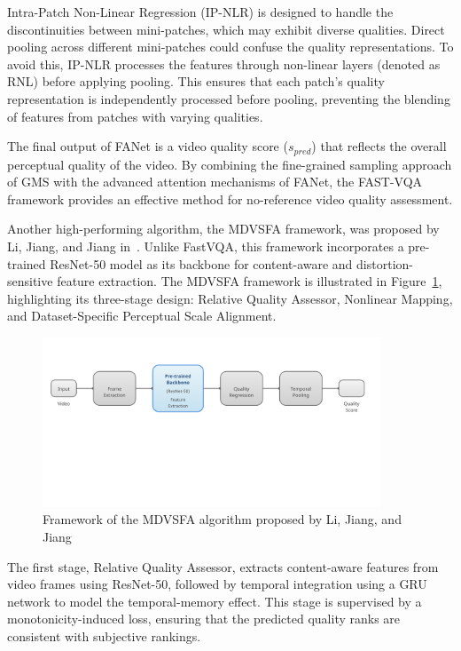 Intra-Patch Non-Linear Regression (IP-NLR) is designed to handle the discontinuities between mini-patches, which may exhibit diverse qualities. Direct pooling across different mini-patches could confuse the quality representations. To avoid this, IP-NLR processes the features through non-linear layers (denoted as RNL) before applying pooling. This ensures that each patch's quality representation is independently processed before pooling, preventing the blending of features from patches with varying qualities.

The final output of FANet is a video quality score ($s_{pred}$) that reflects the overall perceptual quality of the video. By combining the fine-grained sampling approach of GMS with the advanced attention mechanisms of FANet, the FAST-VQA framework provides an effective method for no-reference video quality assessment.

Another high-performing algorithm, the MDVSFA framework, was proposed by Li, Jiang, and Jiang in~\cite{li2023unified}. Unlike FastVQA, this framework incorporates a pre-trained ResNet-50 model as its backbone for content-aware and distortion-sensitive feature extraction. The MDVSFA framework is illustrated in Figure~\ref{fig:framework2}, highlighting its three-stage design: Relative Quality Assessor, Nonlinear Mapping, and Dataset-Specific Perceptual Scale Alignment.

\begin{figure}
\centering
\includegraphics[width=0.9\textwidth]{figures/unified-vqa-framework-3.png}
\caption{Framework of the MDVSFA algorithm proposed by Li, Jiang, and Jiang~\cite{li2023unified}}
\label{fig:framework2}
\end{figure}

The first stage, Relative Quality Assessor, extracts content-aware features from video frames using ResNet-50, followed by temporal integration using a GRU network to model the temporal-memory effect. This stage is supervised by a monotonicity-induced loss, ensuring that the predicted quality ranks are consistent with subjective rankings.

